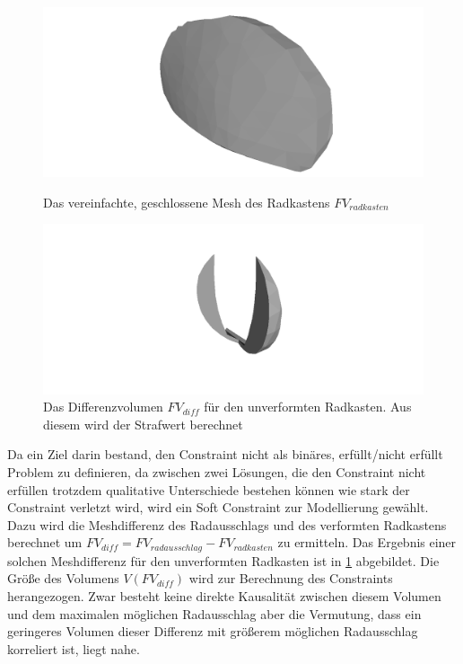 \begin{figure}[h]
	\centering
	\begin{minipage}{0.45\textwidth}
		\centering
		\includegraphics[width=.5\linewidth]{bilder/simplified_wheelcase}
		\caption{Das vereinfachte, geschlossene Mesh des Radkastens $FV_{radkasten}$}
		\label{fig:wheelcase_volume}
	\end{minipage}\hfill
	\begin{minipage}{0.45\textwidth}
		\centering
		\includegraphics[width=.5\linewidth]{bilder/difference.png}
		\caption{Das Differenzvolumen $FV_{diff}$ für den unverformten Radkasten. Aus diesem wird der Strafwert berechnet}
		\label{fig:diff_volume}
	\end{minipage}
\end{figure}
Da ein Ziel darin bestand, den Constraint nicht als binäres, erfüllt/nicht erfüllt Problem zu definieren, da zwischen zwei Lösungen, die den Constraint nicht erfüllen trotzdem qualitative Unterschiede bestehen können wie stark der Constraint verletzt wird, wird ein Soft Constraint zur Modellierung gewählt.
Dazu wird die Meshdifferenz des Radausschlags und des verformten Radkastens berechnet um $FV_{diff} = FV_{radausschlag} - FV_{radkasten}$ zu ermitteln.
Das Ergebnis einer solchen Meshdifferenz für den unverformten Radkasten ist in \cref{fig:diff_volume} abgebildet.
Die Größe des Volumens $V(FV_{diff})$ wird zur Berechnung des Constraints herangezogen.
Zwar besteht keine direkte Kausalität zwischen diesem Volumen und dem maximalen möglichen Radausschlag aber die Vermutung, dass ein geringeres Volumen dieser Differenz mit größerem möglichen Radausschlag korreliert ist, liegt nahe.

